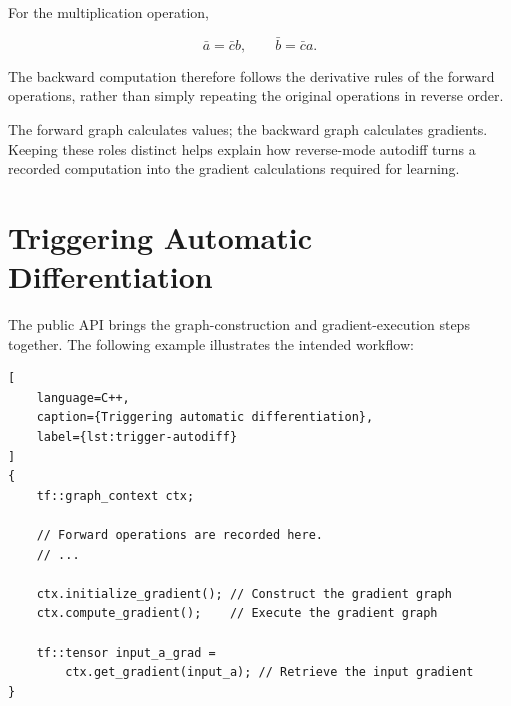 For the multiplication operation,

\[
\bar{a}=\bar{c}b,
\qquad
\bar{b}=\bar{c}a.
\]

The backward computation therefore follows the derivative rules of the forward operations, rather than simply repeating the original operations in reverse order.

\begin{center}
\end{center}

The forward graph calculates values; the backward graph calculates gradients. Keeping these roles distinct helps explain how reverse-mode autodiff turns a recorded computation into the gradient calculations required for learning.

\section{Triggering Automatic Differentiation}

The public API brings the graph-construction and gradient-execution steps together. The following example illustrates the intended workflow:

\begin{lstlisting}[
    language=C++,
    caption={Triggering automatic differentiation},
    label={lst:trigger-autodiff}
]
{
    tf::graph_context ctx;

    // Forward operations are recorded here.
    // ...

    ctx.initialize_gradient(); // Construct the gradient graph
    ctx.compute_gradient();    // Execute the gradient graph

    tf::tensor input_a_grad =
        ctx.get_gradient(input_a); // Retrieve the input gradient
}
\end{lstlisting}

